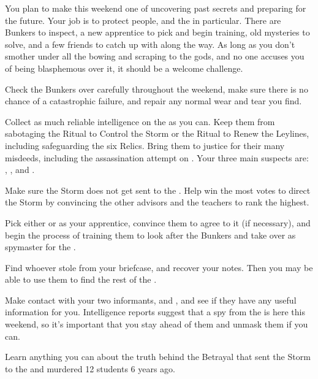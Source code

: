 \documentclass[char]{GL2020}
\begin{document}
You plan to make this weekend one of uncovering past secrets and preparing for the future. Your job is to protect people, and the \pShippies{} in particular. There are Bunkers to inspect, a new apprentice to pick and begin training, old mysteries to solve, and a few friends to catch up with along the way. As long as you don't smother under all the bowing and scraping to the gods, and no one accuses you of being blasphemous over it, it should be a welcome challenge.

\begin{itemz}
	\item Check the Bunkers over carefully throughout the weekend, make sure there is no chance of a catastrophic failure, and repair any normal wear and tear you find.
	\item Collect as much reliable intelligence on the \pGoaties{} as you can. Keep them from sabotaging the Ritual to Control the Storm or the Ritual to Renew the Leylines, including safeguarding the six Relics. Bring them to justice for their many misdeeds, including the assassination attempt on \cHeadDiplomat{}. Your three main suspects are: \cChupLeader{}, \cJuniorStatesman{}, and \cEbbPriest{}.
	\item Make sure the Storm does not get sent to the \pShip{}. Help \cWarlordDaughter{} win the most votes to direct the Storm by convincing the other \pShip{} advisors and the \pFarm{} teachers to rank \cWarlordDaughter{\them} the highest.
	\item Pick either \cTechStar{} or \cInitiate{} as your apprentice, convince them to agree to it (if necessary), and begin the process of training them to look after the Bunkers and take over as spymaster for the \pShippies{}.
	\item Find whoever stole \iFolderOfNotes{} from your briefcase, and recover your notes. Then you may be able to use them to find the rest of the \pGoaties{}.
	\item Make contact with your two informants, \cEthics{} and \cAssistantScientist{}, and see if they have any useful information for you. Intelligence reports suggest that a spy from the \pFarm{} is here this weekend, so it's important that you stay ahead of them and unmask them if you can.
	\item Learn anything you can about the truth behind the Betrayal that sent the Storm to the \pShip{} and murdered 12 students 6 years ago.
\end{itemz}
\end{document}

